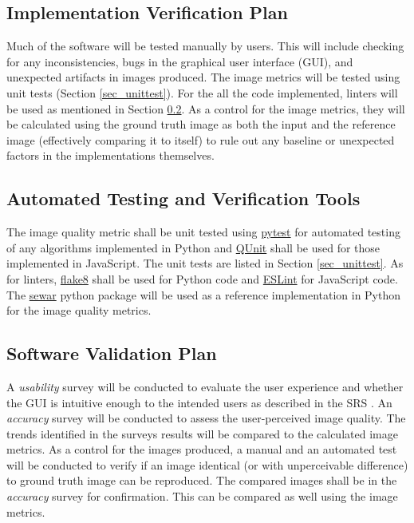 \documentclass[12pt, titlepage]{article}
\begin{document}
\subsection{Implementation Verification Plan}  \label{sec_impl_vplan}

Much of the software will be tested manually by users. This will include checking for
any inconsistencies, bugs in the graphical user interface (GUI), and unexpected
artifacts in images produced.
The image metrics will be tested using unit tests (Section \ref{sec_unittest}). For the
all the code implemented, linters will be used as mentioned in Section \ref{sec_autotest_tools}.
As a control for the image metrics, they will be calculated using the ground truth image as both the 
input and the reference image (effectively comparing it to itself) 
to rule out any baseline or unexpected factors in the implementations themselves.


\subsection{Automated Testing and Verification Tools} \label{sec_autotest_tools}

The image quality metric shall be unit tested using \href{https://pytest.org}{pytest} for 
automated testing of any algorithms implemented in Python and \href{https://qunitjs.com}{QUnit} 
shall be used for those implemented in JavaScript. The unit tests are listed in 
Section \ref{sec_unittest}.
As for linters, \href{https://flake8.pycqa.org}{flake8} shall be used for Python code 
and \href{https://eslint.org}{ESLint} for JavaScript code.
The \href{https://github.com/andrewekhalel/sewar}{sewar} python package will be 
used as a reference implementation in Python for the image quality metrics.


\subsection{Software Validation Plan}
A \textit{usability} survey will be conducted to evaluate the user experience and whether 
the GUI is intuitive enough to the intended users as described in the SRS \citep{SRS}.
An \textit{accuracy} survey will be conducted to assess the user-perceived image quality. 
The trends identified in the surveys results will be compared to the calculated image metrics.
As a control for the images produced, a manual and an automated test will be conducted to verify if 
an image identical (or with unperceivable difference) to ground truth image can be reproduced.
The compared images shall be in the \textit{accuracy} survey for confirmation. This can be compared
as well using the image metrics. 
\end{document}

